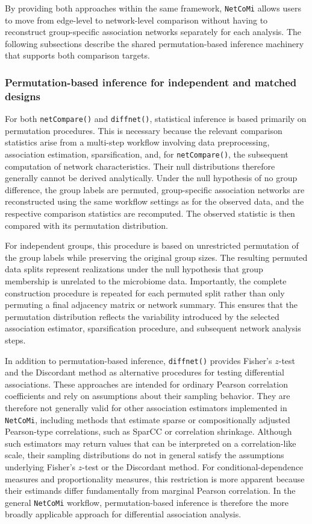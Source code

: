 By providing both approaches within the same framework, \texttt{NetCoMi} allows users to move from edge-level to network-level comparison without having to reconstruct group-specific association networks separately for each analysis. The following subsections describe the shared permutation-based inference machinery that supports both comparison targets.

\subsubsection*{Permutation-based inference for independent and matched designs}

For both \texttt{netCompare()} and \texttt{diffnet()}, statistical inference is based primarily on permutation procedures. This is necessary because the relevant comparison statistics arise from a multi-step workflow involving data preprocessing, association estimation, sparsification, and, for \texttt{netCompare()}, the subsequent computation of network characteristics. Their null distributions therefore generally cannot be derived analytically. Under the null hypothesis of no group difference, the group labels are permuted, group-specific association networks are reconstructed using the same workflow settings as for the observed data, and the respective comparison statistics are recomputed. The observed statistic is then compared with its permutation distribution.

For independent groups, this procedure is based on unrestricted permutation of the group labels while preserving the original group sizes. The resulting permuted data splits represent realizations under the null hypothesis that group membership is unrelated to the microbiome data. Importantly, the complete construction procedure is repeated for each permuted split rather than only permuting a final adjacency matrix or network summary. This ensures that the permutation distribution reflects the variability introduced by the selected association estimator, sparsification procedure, and subsequent network analysis steps.

In addition to permutation-based inference, \texttt{diffnet()} provides Fisher's $z$-test and the Discordant method as alternative procedures for testing differential associations. These approaches are intended for ordinary Pearson correlation coefficients and rely on assumptions about their sampling behavior. They are therefore not generally valid for other association estimators implemented in \texttt{NetCoMi}, including methods that estimate sparse or compositionally adjusted Pearson-type correlations, such as SparCC or correlation shrinkage. Although such estimators may return values that can be interpreted on a correlation-like scale, their sampling distributions do not in general satisfy the assumptions underlying Fisher's $z$-test or the Discordant method. For conditional-dependence measures and proportionality measures, this restriction is more apparent because their estimands differ fundamentally from marginal Pearson correlation. In the general \texttt{NetCoMi} workflow, permutation-based inference is therefore the more broadly applicable approach for differential association analysis.

